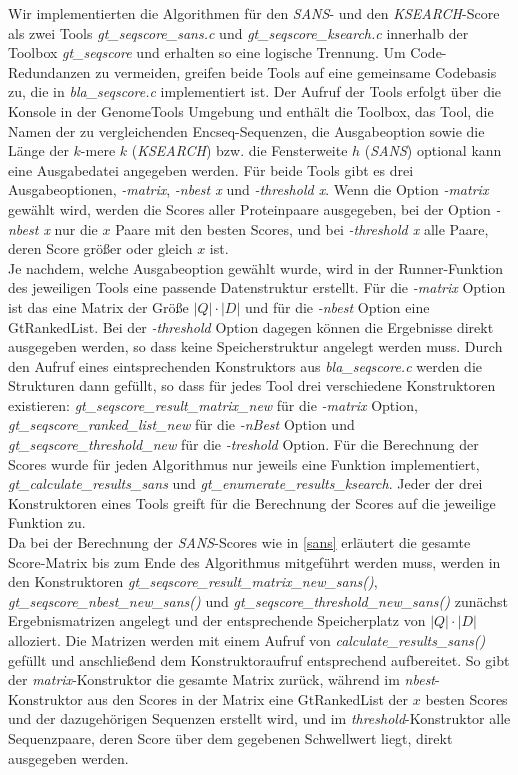\documentclass{article}
\begin{document}
Wir implementierten die Algorithmen für den \emph{SANS}- und den \emph{KSEARCH}-Score als zwei Tools \emph{gt\_seqscore\_sans.c} und \emph{gt\_seqscore\_ksearch.c} innerhalb der Toolbox \emph{gt\_seqscore} und erhalten so eine logische Trennung. Um Code-Redundanzen zu vermeiden, greifen beide Tools auf eine gemeinsame Codebasis zu, die in \emph{bla\_seqscore.c} implementiert ist. Der Aufruf der Tools erfolgt über die Konsole in der GenomeTools Umgebung und enthält die Toolbox, das Tool, die Namen der zu vergleichenden Encseq-Sequenzen, die Ausgabeoption sowie die Länge der $k$-mere $k$ (\emph{KSEARCH}) bzw. die Fensterweite $h$ (\emph{SANS}) optional kann eine Ausgabedatei angegeben werden.
Für beide Tools gibt es drei Ausgabeoptionen, \emph{-matrix}, \emph{-nbest x} und \emph{-threshold x}. Wenn die Option \emph{-matrix} gewählt wird, werden die Scores aller Proteinpaare ausgegeben, bei der Option \emph{-nbest x} nur die $x$ Paare mit den besten Scores, und bei \emph{-threshold x} alle Paare, deren Score größer oder gleich $x$ ist. \\
Je nachdem, welche Ausgabeoption gewählt wurde, wird in der Runner-Funktion des jeweiligen Tools eine passende Datenstruktur erstellt. Für die \emph{-matrix} Option ist das eine Matrix der Größe $|Q|\cdot|D|$ und für die \emph{-nbest} Option eine GtRankedList. Bei der \emph{-threshold} Option dagegen können die Ergebnisse direkt ausgegeben werden, so dass keine Speicherstruktur angelegt werden muss. Durch den Aufruf eines eintsprechenden Konstruktors aus \emph{bla\_seqscore.c} werden die Strukturen dann gefüllt, so dass für jedes Tool drei verschiedene Konstruktoren existieren:
\emph{gt\_seqscore\_result\_matrix\_new} für die \emph{-matrix} Option, \emph{gt\_seqscore\_ranked\_list\_new} für die \emph{-nBest} Option und \emph{gt\_seqscore\_threshold\_new} für die \emph{-treshold} Option.
Für die Berechnung der Scores wurde für jeden Algorithmus nur jeweils eine Funktion implementiert, \emph{gt\_calculate\_results\_sans} und \emph{gt\_enumerate\_results\_ksearch}. 
Jeder der drei Konstruktoren eines Tools greift für die Berechnung der Scores auf die jeweilige Funktion zu.\\
Da bei der Berechnung der \emph{SANS}-Scores wie in \ref{sans} erläutert die gesamte Score-Matrix bis zum Ende des Algorithmus mitgeführt werden muss, werden in den Konstruktoren \emph{gt\_seqscore\_result\_matrix\_new\_sans()}, \emph{gt\_seqscore\_nbest\_new\_sans()} und  \emph{gt\_seqscore\_threshold\_new\_sans()} zunächst Ergebnismatrizen angelegt und der entsprechende Speicherplatz von $|Q|\cdot|D|$ alloziert. Die Matrizen werden mit einem Aufruf von \emph{calculate\_results\_sans()} gefüllt und anschließend dem Konstruktoraufruf entsprechend aufbereitet. So gibt der \emph{matrix}-Konstruktor die gesamte Matrix zurück, während im \emph{nbest}-Konstruktor aus den Scores in der Matrix eine GtRankedList der $x$ besten Scores und der dazugehörigen Sequenzen erstellt wird, und im \emph{threshold}-Konstruktor alle Sequenzpaare, deren Score über dem gegebenen Schwellwert liegt, direkt ausgegeben werden.\\
\end{document}
